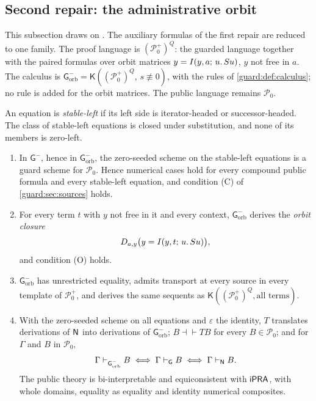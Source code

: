 \subsection{Second repair: the administrative orbit}
\label{guard:sec:orbit}

This subsection draws on .  The auxiliary formulas of
the first repair are reduced to one family.  The proof language is
$(\mathcal P_0^{+})^{Q}$: the guarded language together with the paired
formulas over orbit matrices $y=I(y,a;\,u.\,S u)$, $y$ not free in $a$.
The calculus is
$\mathsf G^{-}_{\mathrm{orb}}=\mathsf K((\mathcal P_0^{+})^{Q},\,s\not\equiv
0)$, with the rules of \cref{guard:def:calculus}; no rule is added for the
orbit matrices.  The public language remains $\mathcal P_0$.

An equation is \emph{stable-left} if its left side is iterator-headed or
successor-headed.  The class of stable-left equations is closed under
substitution, and none of its members is zero-left.

\begin{theorem}
\label{guard:thm:orbit}
\begin{enumerate}[label=\textup{(\roman*)}]
\item In $\mathsf G^{-}$, hence in $\mathsf G^{-}_{\mathrm{orb}}$, the
 zero-seeded scheme on the stable-left equations is a guard scheme for
 $\mathcal P_0$.  Hence numerical cases hold for every compound public
 formula and every stable-left equation, and condition \textup{(C)} of
 \cref{guard:sec:sources} holds.
\item For every term $t$ with $y$ not free in it and every context,
 $\mathsf G^{-}_{\mathrm{orb}}$ derives the \emph{orbit closure}
 \[
  D_{a,y}\bigl(y=I(y,t;\,u.\,S u)\bigr),
 \]
 and condition \textup{(O)} holds.
\item $\mathsf G^{-}_{\mathrm{orb}}$ has unrestricted equality, admits
 transport at every source in every template of $\mathcal P_0^{+}$, and
 derives the same sequents as
 $\mathsf K((\mathcal P_0^{+})^{Q},\text{all terms})$.
\item With the zero-seeded scheme on all equations and $\varepsilon$ the
 identity, $T$ translates derivations of $\mathsf{N}$ into derivations of
 $\mathsf G^{-}_{\mathrm{orb}}$; $B\dashv\vdash TB$ for every
 $B\in\mathcal P_0$; and for $\Gamma$ and $B$ in $\mathcal P_0$,
 \[
  \Gamma\vdash_{\mathsf G^{-}_{\mathrm{orb}}}B
  \iff\Gamma\vdash_{\mathsf G}B
  \iff\Gamma\vdash_{\mathsf{N}}B .
 \]
 The public theory is bi-interpretable and equiconsistent with $\mathsf{iPRA}$,
 with whole domains, equality as equality and identity numerical
 composites.
\end{enumerate}
\end{theorem}

